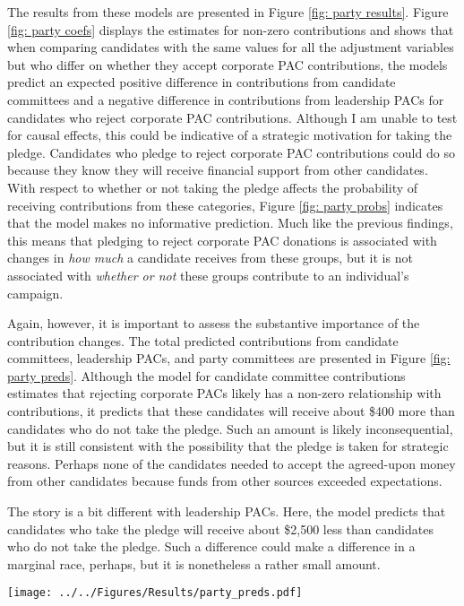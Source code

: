 \documentclass[12pt]{article}
\begin{document}
The results from these models are presented in Figure \ref{fig: party results}. Figure \ref{fig: party coefs} displays the estimates for non-zero contributions and shows that when comparing candidates with the same values for all the adjustment variables but who differ on whether they accept corporate PAC contributions, the models predict an expected positive difference in contributions from candidate committees and a negative difference in contributions from leadership PACs for candidates who reject corporate PAC contributions. Although I am unable to test for causal effects, this could be indicative of a strategic motivation for taking the pledge. Candidates who pledge to reject corporate PAC contributions could do so because they know they will receive financial support from other candidates. With respect to whether or not taking the pledge affects the probability of receiving contributions from these categories, Figure \ref{fig: party probs} indicates that the model makes no informative prediction. Much like the previous findings, this means that pledging to reject corporate PAC donations is associated with changes in \emph{how much} a candidate receives from these groups, but it is not associated with \emph{whether or not} these groups contribute to an individual's campaign. 

Again, however, it is important to assess the substantive importance of the contribution changes. The total predicted contributions from candidate committees, leadership PACs, and party committees are presented in Figure \ref{fig: party preds}. Although the model for candidate committee contributions estimates that rejecting corporate PACs likely has a non-zero relationship with contributions, it predicts that these candidates will receive about \$400 more than candidates who do not take the pledge. Such an amount is likely inconsequential, but it is still consistent with the possibility that the pledge is taken for strategic reasons. Perhaps none of the candidates needed to accept the agreed-upon money from other candidates because funds from other sources exceeded expectations. 

The story is a bit different with leadership PACs. Here, the model predicts that candidates who take the pledge will receive about \$2,500 less than candidates who do not take the pledge. Such a difference could make a difference in a marginal race, perhaps, but it is nonetheless a rather small amount.    

\begin{figure*}[!htb]
    \centering
    \texttt{[image: ../../Figures/Results/party\_preds.pdf]}
    \caption{\textbf{Total Predicted Contributions from Each Party Organization by Candidate Type.} This figure shows that candidates who pledge to reject PAC contributions are predicted to received fewer contributions from leadership PACs but more contributions from candidate and party committees.}
    \label{fig: party preds}
\end{figure*}
\end{document}
